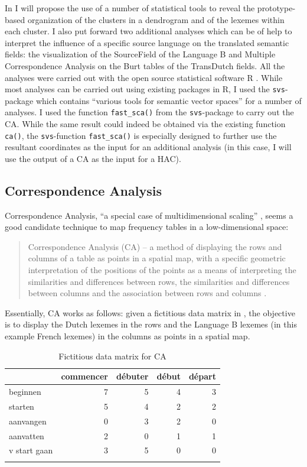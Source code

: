 In  I will propose the use of a number of statistical tools to reveal the prototype-based organization of the clusters in a dendrogram and of the lexemes within each cluster. I also put forward two additional analyses which can be of help to interpret the influence of a specific source language on the translated semantic fields: the visualization of the SourceField of the Language B and Multiple Correspondence Analysis on the Burt tables of the TransDutch fields. All the analyses were carried out with the open source statistical software R \citep{r_core_r:_2014}. While most analyses can be carried out using existing packages in R, I used the \texttt{svs}-package \citep{plevoets_svs:_2015} which contains “various tools for semantic vector spaces” for a number of analyses. I used the function \texttt{fast\_sca()} from the \texttt{svs}-package to carry out the CA. While the same result could indeed be obtained via the existing function \texttt{ca()}, the \texttt{svs}-function \texttt{fast\_sca()} is especially designed to further use the resultant coordinates as the input for an additional analysis (in this case, I will use the output of a CA as the input for a HAC).

\subsection{Correspondence Analysis}\label{sec:3.7.1}\largerpage
Correspondence Analysis, “a special case of multidimensional scaling” \citep[136]{baayen_analyzing_2008}, seems a good candidate technique to map frequency tables in a low-dimensional space:

\begin{quote}
Correspondence Analysis (CA) – a method of displaying the rows and columns of a table as points in a spatial map, with a specific geometric interpretation of the positions of the points as a means of interpreting the similarities and differences between rows, the similarities and differences between columns and the association between rows and columns \citep[264]{greenacre_correspondence_2007}.
\end{quote}

Essentially, CA works as follows: given a fictitious data matrix in , the objective is to display the Dutch lexemes in the rows and the Language B lexemes (in this example French lexemes) in the columns as points in a spatial map.

\begin{table}\caption{Fictitious data matrix for CA\label{tab:3:12}}
\begin{tabular}{lrrrr}
\lsptoprule
& commencer & d\'{e}buter & d\'ebut & d\'epart\\\midrule
beginnen     & 7 & 5 & 4 & 3\\
starten      & 5 & 4 & 2 & 2\\
aanvangen    & 0 & 3 & 2 & 0\\
aanvatten    & 2 & 0 & 1 & 1\\
v start gaan & 3 & 5 & 0 & 0\\
\lspbottomrule
\end{tabular}
\end{table}

